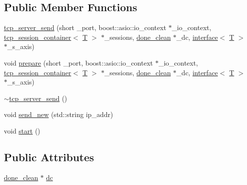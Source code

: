 \subsection*{Public Member Functions}
\begin{DoxyCompactItemize}
\item 
\hyperlink{classgalapagos_1_1net_1_1tcp__server__send_a3857d5f1fd45bb269867d5e0f99e5248}{tcp\+\_\+server\+\_\+send} (short \+\_\+port, boost\+::asio\+::io\+\_\+context $\ast$\+\_\+io\+\_\+context, \hyperlink{classgalapagos_1_1net_1_1tcp__session__container}{tcp\+\_\+session\+\_\+container}$<$ \hyperlink{test_8cpp_a0658ceffa730c765d449bb3d21871b5f}{T} $>$ $\ast$\+\_\+sessions, \hyperlink{classgalapagos_1_1done__clean}{done\+\_\+clean} $\ast$\+\_\+dc, \hyperlink{classgalapagos_1_1interface}{interface}$<$ \hyperlink{test_8cpp_a0658ceffa730c765d449bb3d21871b5f}{T} $>$ $\ast$\+\_\+s\+\_\+axis)
\item 
void \hyperlink{classgalapagos_1_1net_1_1tcp__server__send_a14d064e2ad5e0185c0bada4edfff1426}{prepare} (short \+\_\+port, boost\+::asio\+::io\+\_\+context $\ast$\+\_\+io\+\_\+context, \hyperlink{classgalapagos_1_1net_1_1tcp__session__container}{tcp\+\_\+session\+\_\+container}$<$ \hyperlink{test_8cpp_a0658ceffa730c765d449bb3d21871b5f}{T} $>$ $\ast$\+\_\+sessions, \hyperlink{classgalapagos_1_1done__clean}{done\+\_\+clean} $\ast$\+\_\+dc, \hyperlink{classgalapagos_1_1interface}{interface}$<$ \hyperlink{test_8cpp_a0658ceffa730c765d449bb3d21871b5f}{T} $>$ $\ast$\+\_\+s\+\_\+axis)
\item 
\hyperlink{classgalapagos_1_1net_1_1tcp__server__send_ab18eee975ce0c0d4cc93a293c1ab710e}{$\sim$tcp\+\_\+server\+\_\+send} ()
\item 
void \hyperlink{classgalapagos_1_1net_1_1tcp__server__send_a30cd97b5cb1b51846065a75121fb2656}{send\+\_\+new} (std\+::string ip\+\_\+addr)
\item 
void \hyperlink{classgalapagos_1_1net_1_1tcp__server__send_ade3b0a11a7025ce84b93bca633d9f793}{start} ()
\end{DoxyCompactItemize}
\subsection*{Public Attributes}
\begin{DoxyCompactItemize}
\item 
\hyperlink{classgalapagos_1_1done__clean}{done\+\_\+clean} $\ast$ \hyperlink{classgalapagos_1_1net_1_1tcp__server__send_ae17e0980a0d49b50cb59a98a6774241d}{dc}
\end{DoxyCompactItemize}


